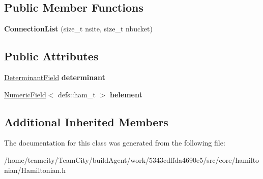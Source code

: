 \subsection*{Public Member Functions}
\begin{DoxyCompactItemize}
\item 
{\bfseries Connection\+List} (size\+\_\+t nsite, size\+\_\+t nbucket)\hypertarget{classHamiltonian_1_1ConnectionList_a8696d497d05710f3bfb3eff5cdaea200}{}\label{classHamiltonian_1_1ConnectionList_a8696d497d05710f3bfb3eff5cdaea200}

\end{DoxyCompactItemize}
\subsection*{Public Attributes}
\begin{DoxyCompactItemize}
\item 
\hyperlink{classDeterminantField}{Determinant\+Field} {\bfseries determinant}\hypertarget{classHamiltonian_1_1ConnectionList_a6b8f99fc32cdc563a8863dc8b81c3e87}{}\label{classHamiltonian_1_1ConnectionList_a6b8f99fc32cdc563a8863dc8b81c3e87}

\item 
\hyperlink{classNumericField}{Numeric\+Field}$<$ defs\+::ham\+\_\+t $>$ {\bfseries helement}\hypertarget{classHamiltonian_1_1ConnectionList_a2e15f602fe21f932f3c1980cb7580d0e}{}\label{classHamiltonian_1_1ConnectionList_a2e15f602fe21f932f3c1980cb7580d0e}

\end{DoxyCompactItemize}
\subsection*{Additional Inherited Members}


The documentation for this class was generated from the following file\+:\begin{DoxyCompactItemize}
\item 
/home/teamcity/\+Team\+City/build\+Agent/work/5343cdffda4690e5/src/core/hamiltonian/Hamiltonian.\+h\end{DoxyCompactItemize}
